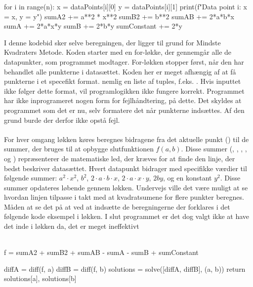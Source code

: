 \begin{python}
    for i in range(n): 
        x = dataPoints[i][0] 
        y = dataPoints[i][1] 
        print(f"Data point {i}: x = {x}, y = {y}") 
        sumA2 += a**2 * x**2 
        sumB2 += b**2      
        sumAB += 2*a*b*x   
        sumA += 2*a*x*y   
        sumB += 2*b*y    
        sumConstant += 2*y 
\end{python}
I denne kodebid sker selve beregningen, der ligger til grund for Mindste Kvadraters Metode. Koden starter med en for-løkke, der gennemgår alle de datapunkter, som programmet modtager. For-løkken stopper først, når den har behandlet alle punkterne i datasættet. Koden her er meget afhængig af at få punkterne i et specefikt format. nemlig en liste af tuples, f.eks. \pythoninline{[(x_1, y_1), (x_2, y_2)]}. Hvis inputtet ikke følger dette format, vil programlogikken ikke fungere korrekt. Programmet har ikke inprogrameret nogen form for fejlhåndtering, på dette. Det skyldes at programmet som det er nu, selv formatere det når punkterne indsættes. Af den grund burde der derfor ikke opstå fejl. \\\\
For hver omgang løkken køres beregnes bidragene fra det aktuelle punkt () til de summer, der bruges til at opbygge slutfunktionen $f(a,b)$. Disse summer (, , , ,  og ) repræsenterer de matematiske led, der kræves for at finde den linje, der bedst beskriver datasættet. Hvert datapunkt bidrager med specifikke værdier til følgende summer: $a^2 \cdot x^2$, $b^2$, $2 \cdot a \cdot b \cdot x$, $2 \cdot a \cdot x \cdot y$, $2by$, og en konstant $y^2$. Disse summer opdateres løbende gennem løkken. Undervejs ville det være muligt at se hvordan linjen tilpasse i takt med at kvadratsumene for flere punkter beregnes. Måden at se det på at ved at indsætte de beregningerne der forklares i det følgende kode eksempel i løkken. I slut programmet er det dog valgt ikke at have det inde i løkken da, det er meget ineffektivt   \\\\
\begin{python}
    f = sumA2 + sumB2 + sumAB - sumA - sumB + sumConstant 

    diffA = diff(f, a) 
    diffB = diff(f, b) 
    solutions = solve([diffA, diffB], (a, b)) 
    return solutions[a], solutions[b] 
\end{python}
